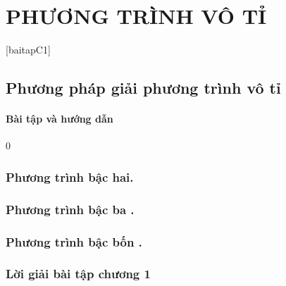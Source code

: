 \part{PHƯƠNG TRÌNH VÔ TỈ}%
\minitoc %

\thispagestyle{empty}
[baitapC1]
\vspace*{1cm}
\chapter{Phương pháp giải phương trình vô tỉ}
    


        \subsection{Bài tập và hướng dẫn} %
        \setcounter{vd}0

 \section{Phương trình bậc hai.}



\section{Phương trình bậc ba .}

\section{Phương trình bậc bốn .}
\section*{Lời giải bài tập chương 1}
{\small}
